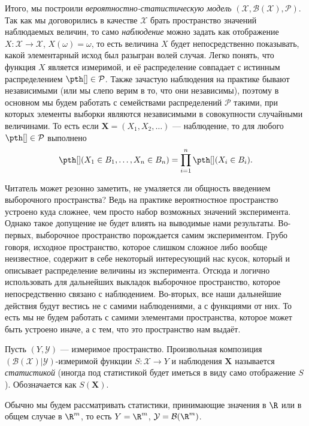 Итого, мы построили \textit{вероятностно-статистическую модель} $(\mathcal{X}, \mathcal{B}(\mathcal{X}), \mathcal{P})$. Так как мы договорились в качестве $\mathcal{X}$ брать пространство значений наблюдаемых величин, то само \textit{наблюдение} можно задать как отображение $X\colon \mathcal{X} \to \mathcal{X}$, $X(\omega) = \omega$, то есть величина $X$ будет непосредственно показывать, какой элементарный исход был разыгран волей случая. Легко понять, что функция $X$ является измеримой, и её распределение совпадает с истинным распределением $\pth[] \in \mathcal{P}$. Также зачастую наблюдения на практике бывают независимыми (или мы слепо верим в то, что они независимы), поэтому в основном мы будем работать с семействами распределений $\mathcal{P}$ такими, при которых элементы выборки являются независимыми в совокупности случайными величинами. То есть если $\mathbf X = (X_1, X_2, \ldots)$ --- наблюдение, то для любого $\pth[] \in \mathcal{P}$ выполнено
\[
\pth[](X_1 \in B_1, \ldots, X_n \in B_n) = \prod_{i=1}^n \pth[](X_i \in B_i).
\]

Читатель может резонно заметить, не умаляется ли общность введением выборочного пространства? Ведь на практике вероятностное пространство устроено куда сложнее, чем просто набор возможных значений эксперимента. Однако такое допущение не будет влиять на выводимые нами результаты. Во-первых, выборочное пространство порождается самим экспериментом. Грубо говоря, исходное пространство, которое слишком сложное либо вообще неизвестное, содержит в себе некоторый интересующий нас кусок, который и описывает распределение величины из эксперимента. Отсюда и логично использовать для дальнейших выкладок выборочное пространство, которое непосредственно связано с наблюдением. Во-вторых, все наши дальнейшие действия будут вестись не с самими наблюдениями, а с функциями от них. То есть мы не будем работать с самими элементами пространства, которое может быть устроено иначе, а с тем, что это пространство нам выдаёт.

\begin{definition}
Пусть $(Y, \mathcal{Y})$ --- измеримое пространство. Произвольная композиция $(\mathcal{B}(\mathcal{X})|\mathcal{Y})$-измеримой функции $S\colon \mathcal{X} \to Y$ и наблюдения $\mathbf X$ называется \textit{статистикой} (иногда под статистикой будет иметься в виду само отображение $S$). Обозначается как $S(\mathbf X)$.
\end{definition}

Обычно мы будем рассматривать статистики, принимающие значения в $\R$ или в общем случае в $\R^m$, то есть $Y = \R^m$, $\mathcal Y = \mathcal B (\R^m)$.


